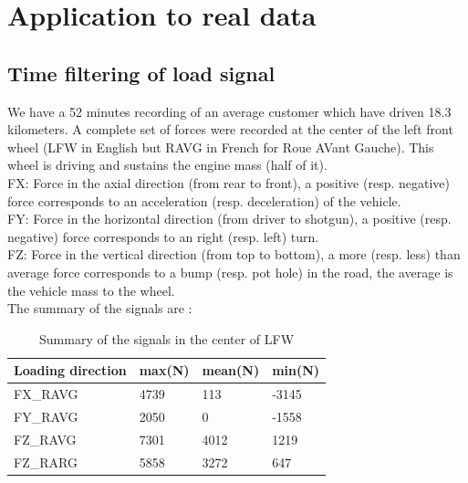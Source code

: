\documentclass[3p,times,procedia,number]{elsarticle}
\begin{document}
\section{Application to real data}
\subsection{Time filtering of load signal}
We have a 52 minutes recording of an average customer which have driven 18.3 kilometers. A complete set of forces were recorded at the center of the left front wheel (LFW in English but RAVG in French for Roue AVant Gauche). This wheel is driving and sustains the engine mass (half of it).\\
FX: Force in the axial direction (from rear to front), a positive (resp. negative) force corresponds to an acceleration (resp. deceleration) of the vehicle.\\
FY: Force in the horizontal direction (from driver to shotgun), a positive (resp. negative) force corresponds to an right (resp. left) turn.\\
FZ: Force in the vertical direction (from top to bottom), a more (resp. less) than average force corresponds to a bump (resp. pot hole) in the road, the average is the vehicle mass to the wheel.\\

The summary of the signals are :
\begin{table}[]
	\centering
	\begin{tabular}{llll}
		\hline
		\multicolumn{1}{c}{\textbf{Loading direction}} & \multicolumn{1}{c}{\textbf{max(N)}} & \multicolumn{1}{c}{\textbf{mean(N)}} & \multicolumn{1}{c}{\textbf{min(N)}} \\ \hline
		FX\_RAVG                                       & 4739                                & 113                                  & -3145                               \\
		FY\_RAVG                                       & 2050                                & 0                                    & -1558                               \\
		FZ\_RAVG                                       & 7301       & 4012                                 & 1219                                \\
		FZ\_RARG                                       & 5858                                & 3272                                 & 647                                 \\ \hline
	\end{tabular}
	\caption{Summary of the signals in the center of LFW}
	\label{data}
\end{table}
\end{document}
